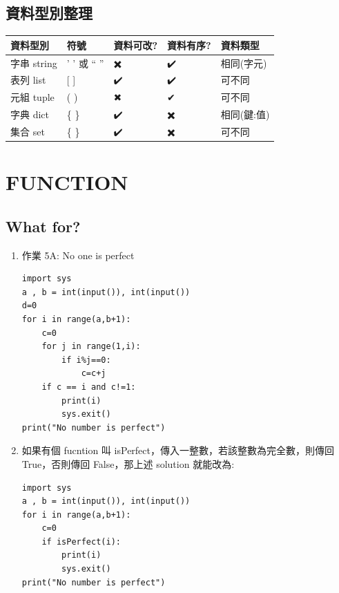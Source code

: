 \documentclass[a4paper,12pt]{article}
\begin{document}
\subsection{資料型別整理}
\label{sec:org369a7bc}
\begin{center}
\begin{tabular}{lllll}
\hline
資料型別 & 符號 & 資料可改? & 資料有序? & 資料類型\\
\hline
字串 string & ' ' 或 `` '' & ✖️ & ✔️ & 相同(字元)\\
表列 list & [ ] & ✔️ & ✔️ & 可不同\\
元組 tuple & ( ) & ✖ & ️✔ & ️可不同\\
字典 dict & \{ \} & ✔️ & ✖️ & 相同(鍵:值)\\
集合 set & \{ \} & ✔️ & ✖️ & 可不同\\
\hline
\end{tabular}
\end{center}

\newpage

\section{FUNCTION}
\label{py--functions}
\subsection{What for?}
\label{sec:org6594cb5}
\begin{enumerate}
\item 作業 5A: No one is perfect
\label{sec:org193013b}
\lstset{breaklines=true,language=Python,label= ,caption= ,captionpos=b,firstnumber=1,numbers=left}
\begin{lstlisting}
import sys
a , b = int(input()), int(input())
d=0
for i in range(a,b+1):
    c=0
    for j in range(1,i):
        if i%j==0:
            c=c+j
    if c == i and c!=1:
        print(i)
        sys.exit()
print("No number is perfect")
\end{lstlisting}
\item 如果有個 fucntion 叫 isPerfect，傳入一整數，若該整數為完全數，則傳回 True，否則傳回 False，那上述 solution 就能改為:
\label{sec:orgab57d1e}
\lstset{breaklines=true,language=Python,label= ,caption= ,captionpos=b,firstnumber=1,numbers=left}
\begin{lstlisting}
import sys
a , b = int(input()), int(input())
for i in range(a,b+1):
    c=0
    if isPerfect(i):
        print(i)
        sys.exit()
print("No number is perfect")
\end{lstlisting}
\end{enumerate}
\end{document}
